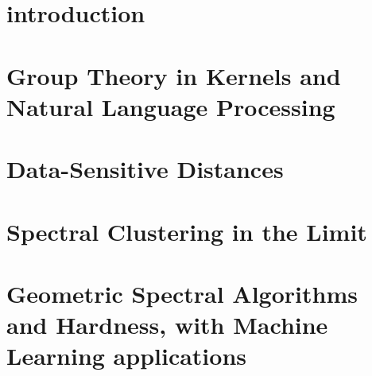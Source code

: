 \documentclass[12pt]{cmuthesis}
\begin{document}
\tableofcontents
\listoffigures
\listoftables

\mainmatter


%
%
%
%
%


\chapter{introduction}

\chapter{Group Theory in Kernels and Natural Language
Processing}\label{sec:ker-main}

\chapter{Data-Sensitive Distances}\label{sec:ds-main}

\chapter{Spectral Clustering in the Limit}\label{sec:spec-main}

\chapter{Geometric Spectral Algorithms and Hardness, with Machine
Learning applications}\label{sec:sgt-main}

%
\end{document}

